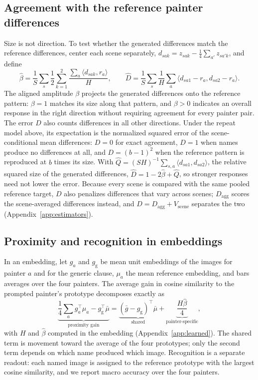 \documentclass[10pt]{article}
\newcommand{\ip}[2]{\langle #1,#2\rangle}
\begin{document}
\subsection{Agreement with the reference painter differences}

Size is not direction. To test whether the generated differences match the
reference differences, center each scene separately,
$d_{sak}=z_{sak}-\frac14\sum_{a'}z_{sa'k}$, and define
\begin{equation}
\widehat\beta=\frac1S\sum_s\frac{1}{2}\sum_{k=1}^2
\frac{\sum_a\ip{d_{sak}}{r_a}}{H},\qquad
\widehat D=\frac1S\sum_s\frac1H\sum_a\ip{d_{sa1}-r_a}{d_{sa2}-r_a}.
\label{eq:beta-d}
\end{equation}
The aligned amplitude $\beta$ projects the generated differences onto the
reference pattern: $\beta=1$ matches its size along that pattern, and $\beta>0$
indicates an overall response in the right direction without requiring agreement
for every painter pair. The error $D$ also counts differences in all other
directions. Under the repeat model above, its expectation is the normalized
squared error of the scene-conditional mean differences: $D=0$ for exact
agreement, $D=1$ when names produce no differences at all, and $D=(b-1)^2$ when the
reference pattern is reproduced at $b$ times its size. With
$\widehat Q=(SH)^{-1}\sum_{s,a}\ip{d_{sa1}}{d_{sa2}}$, the relative squared size of
the generated differences, $\widehat D=1-2\widehat\beta+\widehat Q$, so stronger
responses need not lower the error. Because every scene is compared with the same
pooled reference target, $D$ also penalizes differences that vary across scenes;
$D_{\mathrm{agg}}$ scores the scene-averaged differences instead, and
$D=D_{\mathrm{agg}}+V_{\mathrm{scene}}$ separates the two
(Appendix~\ref{app:estimators}).

\subsection{Proximity and recognition in embeddings}

In an embedding, let $g_a$ and $g_{\mathrm{g}}$ be mean unit embeddings of the
images for painter $a$ and for the generic clause, $\mu_a$ the mean reference
embedding, and bars averages over the four painters. The average gain in cosine
similarity to the prompted painter's prototype decomposes exactly as
\begin{equation}
\underbrace{\frac14\sum_a g_a^\top\mu_a-g_{\mathrm{g}}^\top\bar\mu}_{\text{proximity gain}}
=\underbrace{(\bar g-g_{\mathrm{g}})^\top\bar\mu}_{\text{shared}}
+\underbrace{\frac{H\widehat\beta}{4}}_{\text{painter-specific}},
\label{eq:prototype-gain}
\end{equation}
with $H$ and $\widehat\beta$ computed in the embedding (Appendix~\ref{app:learned}).
The shared term is movement toward the average of the four prototypes; only the
second term depends on which name produced which image. Recognition is a separate
readout: each named image is assigned to the reference prototype with the largest
cosine similarity, and we report macro accuracy over the four painters.
\end{document}
